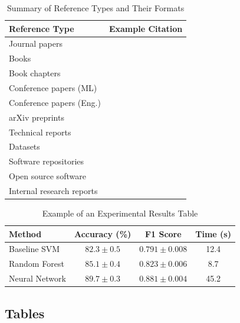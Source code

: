\documentclass{iteso-irr}
\begin{document}
\begin{table}[t]
  \centering
  \caption{Summary of Reference Types and Their Formats}
  \label{tab:reference_types}
  \begin{tabular}{l l}
    \toprule
    \textbf{Reference Type} & \textbf{Example Citation} \\
    \midrule
    Journal papers               & \cite{ref:lecun2015} \\
    Books                        & \cite{ref:goodfellow2016} \\
    Book chapters                & \cite{ref:rayas2013ch} \\
    Conference papers (ML)       & \cite{ref:he2016resnet} \\
    Conference papers (Eng.)     & \cite{ref:rayas2004conf} \\
    arXiv preprints              & \cite{ref:vaswani2017attention} \\
    Technical reports            & \cite{ref:openai2023gpt4} \\
    Datasets                     & \cite{ref:deng2009imagenet} \\
    Software repositories        & \cite{ref:pytorch2019} \\
    Open source software         & \cite{ref:python} \\
    Internal research reports    & \cite{ref:rayas2015word} \\
    \bottomrule
  \end{tabular}
\end{table}

\begin{table}[t]
  \centering
  \caption{Example of an Experimental Results Table}
  \label{tab:results_example}
  \begin{tabular}{l c c c}
    \toprule
    \textbf{Method} & \textbf{Accuracy (\%)} & \textbf{F1 Score}
                    & \textbf{Time (s)} \\
    \midrule
    Baseline SVM       & $82.3 \pm 0.5$ & $0.791 \pm 0.008$ & 12.4 \\
    Random Forest      & $85.1 \pm 0.4$ & $0.823 \pm 0.006$ & 8.7 \\
    Neural Network     & $\mathbf{89.7 \pm 0.3}$ & $\mathbf{0.881 \pm 0.004}$
                       & 45.2 \\
    \bottomrule
  \end{tabular}
\end{table}

\subsection{Tables}
\label{sec:tables}
\end{document}
